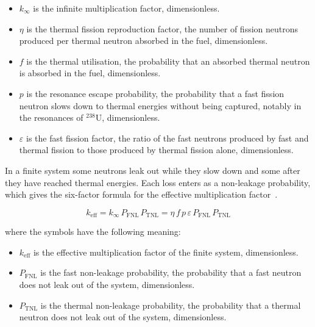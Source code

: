 \begin{itemize}
  \item $k_\infty$ is the infinite multiplication factor, dimensionless.

  \item $\eta$ is the thermal fission reproduction factor, the number of
        fission neutrons produced per thermal neutron absorbed in the
        fuel, dimensionless.

  \item $f$ is the thermal utilisation, the probability that an absorbed
        thermal neutron is absorbed in the fuel, dimensionless.

  \item $p$ is the resonance escape probability, the probability that a
        fast fission neutron slows down to thermal energies without being
        captured, notably in the resonances of $^{238}$U, dimensionless.

  \item $\varepsilon$ is the fast fission factor, the ratio of the fast
        neutrons produced by fast and thermal fission to those produced
        by thermal fission alone, dimensionless.
\end{itemize}

In a finite system some neutrons leak out while they slow down and some
after they have reached thermal energies. Each loss enters as a
non-leakage probability, which gives the six-factor formula for the
effective multiplication factor~\cite{duderstadt_hamilton_1976}.

\begin{equation}
k_\mathrm{eff} = k_\infty\, P_\mathrm{FNL}\, P_\mathrm{TNL}
= \eta\, f\, p\, \varepsilon\, P_\mathrm{FNL}\, P_\mathrm{TNL}
\label{eq:keff}
\end{equation}

\noindent where the symbols have the following meaning:

\begin{itemize}
  \item $k_\mathrm{eff}$ is the effective multiplication factor of the
        finite system, dimensionless.

  \item $P_\mathrm{FNL}$ is the fast non-leakage probability, the
        probability that a fast neutron does not leak out of the system,
        dimensionless.

  \item $P_\mathrm{TNL}$ is the thermal non-leakage probability, the
        probability that a thermal neutron does not leak out of the
        system, dimensionless.
\end{itemize}

